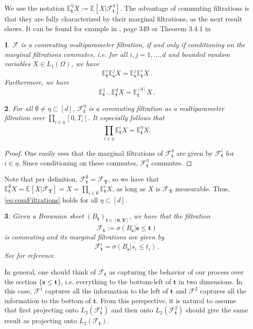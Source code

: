 \documentclass[11pt,oneside,english,reqno]{amsart}
\numberwithin{equation}{section}
\numberwithin{figure}{section}
\theoremstyle{plain}
\newtheorem{thm}{\protect\theoremname}
\theoremstyle{definition}
\theoremstyle{remark}
\theoremstyle{plain}
\theoremstyle{plain}
\theoremstyle{plain}
\newtheorem{cor}[thm]{\protect\corollaryname}
\theoremstyle{plain}
\newtheorem{example}[thm]{\protect\examplename}
\theoremstyle{plain}
\providecommand{\corollaryname}{Corollary}
\providecommand{\theoremname}{Theorem}
\providecommand{\examplename}{Example}
\newcommand{\cF}{\mathcal{F}}
\newcommand{\EE}{\mathbb{E}}
\newcommand{\bT}{\mathbf{T}}
\newcommand{\boo}{\mathbf{0}}
\newcommand{\bs}{\mathbf{s}}
\newcommand{\bt}{\mathbf{t}}
\begin{document}
We use the notation $\EE^\eta_\bt X := \EE[X\vert\cF^\eta_\bt]$. The advantage of commuting filtrations is that they are fully characterized by their marginal filtrations, as the next result shows. It can be found for example in \cite{Walsh86}, page 349 or Theorem 3.4.1 in \cite{Khoshnevisan02}
%
\begin{thm}
    $\cF$ is a commuting multiparameter filtration, if and only if conditioning on the marginal filtrations commutes, i.e. for all $i,j=1,\dots,d$ and bounded random variables $X\in L_1(\Omega)$, we have
%
    \begin{equation*}
        \EE^i_\bt \EE^j_\bs X = \EE^j_\bs \EE^i_\bt X\,.
    \end{equation*}
%
    Furthermore, we have
%
    \begin{equation*}
        \EE^1_\bt\dots\EE^d_\bt X = \EE^{[d]}_\bt X\,.
    \end{equation*}
\end{thm}
%
\begin{cor}
    For all $\emptyset\neq\eta\subset[d]$, $\cF_\bt^\eta$ is a commuting filtration as a multiparameter filtration over $\prod_{i\in\eta} [0,T_i]$. It especially follows that
%
    \begin{equation}\label{eq:comFiltrations}
        \prod_{i\in\eta}\EE^i_\bt X = \EE^\eta_\bt X.
    \end{equation}
\end{cor}
%
\begin{proof}
    One easily sees that the marginal filtrations of $\cF_\bt^\eta$ are given by $\cF^i_\bt$ for $i\in\eta$. Since conditioning on these commutes, $\cF^\eta_\bt$ commutes.
\end{proof}
%
\noindent Note that per definition, $\cF^\emptyset_\bt = \cF_\bT$, so we have that $\EE^\emptyset_\bt X = \EE[X\vert\cF_\bT] = X = \prod_{i\in\emptyset} \EE^i_\bt X$, as long as $X$ is $\cF_\bT$ measurable. Thus, \eqref{eq:comFiltrations} holds for all $\eta\subset[d]$.
%
\begin{example}
    Given a Brownian sheet $(B_\bt)_{\bt\in[\boo,\bT]}$, we have that the filtration
%
    \begin{equation*}
        \cF_\bt := \overline{\sigma\left(B_\bs\vert\bs\le\bt\right)}
    \end{equation*}
%
    is commuting and its marginal filtrations are given by
%
    \begin{equation*}
        \cF^i_\bt = \overline{\sigma\left(B_\bs\vert s_i\le t_i\right)}\,.
    \end{equation*}
%
    See \cite{Walsh86} for reference.
\end{example}
%
\noindent In general, one should think of $\cF_\bt$ as capturing the behavior of our process over the section $\{\bs\le\bt\}$, i.e. everything to the bottom-left of $\bt$ in two dimensions. In this case, $\cF^1$ captures all the information to the left of $\bt$ and $\cF^2$ captures all the information to the bottom of $\bt$. From this perspective, it is natural to assume that first projecting onto $L_2(\cF^1_\bt)$ and then onto $L_2(\cF^2_\bt)$ should give the same result as projecting onto $L_2(\cF_\bt)$. 
\end{document}
